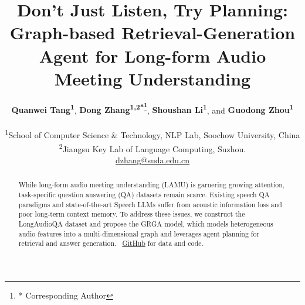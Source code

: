 \documentclass[11pt]{article}
\title{Don't Just Listen, Try Planning: Graph-based Retrieval-Generation Agent for Long-form Audio Meeting Understanding}
\author{
 \textbf{Quanwei Tang\textsuperscript{1}},
 \textbf{Dong Zhang\textsuperscript{1,2*\footnote{* Corresponding Author}}},
 \textbf{Shoushan Li\textsuperscript{1}}, and
 \textbf{Guodong Zhou\textsuperscript{1}}
\\
\\
 \textsuperscript{1}School of Computer Science \& Technology, NLP Lab, Soochow University, China \\  \textsuperscript{2}Jiangsu Key Lab of Language Computing, Suzhou. \\
 \small{
   \href{mailto: dzhang@suda.edu.cn}{ dzhang@suda.edu.cn}
 }
}
\begin{document}
\maketitle
\begin{abstract}
While long-form audio meeting understanding (LAMU) is garnering growing attention, task-specific question answering (QA) datasets remain scarce. Existing speech QA paradigms and state-of-the-art Speech LLMs suffer from acoustic information loss and poor long-term context memory. To address these issues, we construct the LongAudioQA dataset and propose the GRGA model,  which models heterogeneous audio features into a multi-dimensional graph and leverages agent planning for retrieval and answer generation. ~\href{https://github.com/tangquanwei/GRGA}{GitHub} for data and code.
\end{abstract}
\end{document}
